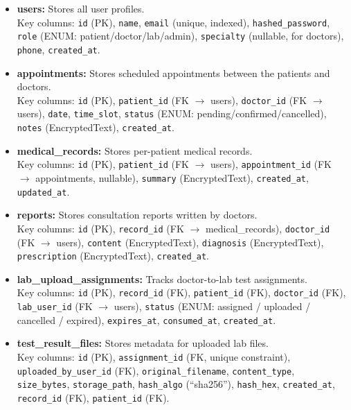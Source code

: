 \documentclass[a4paper,12pt]{report}
\begin{document}
\begin{itemize}
    \item \textbf{users:} Stores all user profiles.\\
    Key columns: \texttt{id} (PK), \texttt{name}, \texttt{email} (unique, indexed), \texttt{hashed\_password}, \texttt{role} (ENUM: patient/doctor/lab/admin), \texttt{specialty} (nullable, for doctors), \texttt{phone}, \texttt{created\_at}.

    \item \textbf{appointments:} Stores scheduled appointments between the patients and doctors. \\
    Key columns: \texttt{id} (PK), \texttt{patient\_id} (FK $\rightarrow$ users), \texttt{doctor\_id} (FK $\rightarrow$ users), \texttt{date}, \texttt{time\_slot}, \texttt{status} (ENUM: pending/confirmed/cancelled), \texttt{notes} (EncryptedText), \texttt{created\_at}.

    \item \textbf{medical\_records:} Stores per-patient medical records. \\
    Key columns: \texttt{id} (PK), \texttt{patient\_id} (FK $\rightarrow$ users), \texttt{appointment\_id} (FK $\rightarrow$ appointments, nullable), \texttt{summary} (EncryptedText), \texttt{created\_at}, \texttt{updated\_at}.

    \item \textbf{reports:} Stores consultation reports written by doctors. \\
    Key columns: \texttt{id} (PK), \texttt{record\_id} (FK $\rightarrow$ medical\_records), \texttt{doctor\_id} (FK $\rightarrow$ users), \texttt{content} (EncryptedText), \texttt{diagnosis} (EncryptedText), \texttt{prescription} (EncryptedText), \texttt{created\_at}.

    \item \textbf{lab\_upload\_assignments:} Tracks doctor-to-lab test assignments. \\
    Key columns: \texttt{id} (PK), \texttt{record\_id} (FK), \texttt{patient\_id} (FK), \texttt{doctor\_id} (FK), \texttt{lab\_user\_id} (FK $\rightarrow$ users), \texttt{status} (ENUM: assigned / uploaded / cancelled / expired), \texttt{expires\_at}, \texttt{consumed\_at}, \texttt{created\_at}.

    \item \textbf{test\_result\_files:} Stores metadata for uploaded lab files. \\
    Key columns: \texttt{id} (PK), \texttt{assignment\_id} (FK, unique constraint),\\ \texttt{uploaded\_by\_user\_id} (FK), \texttt{original\_filename}, \texttt{content\_type}, \texttt{size\_bytes}, \texttt{storage\_path}, \texttt{hash\_algo} (``sha256''), \texttt{hash\_hex}, \texttt{created\_at}, \texttt{record\_id} (FK), \texttt{patient\_id} (FK).


\end{itemize}
\end{document}
